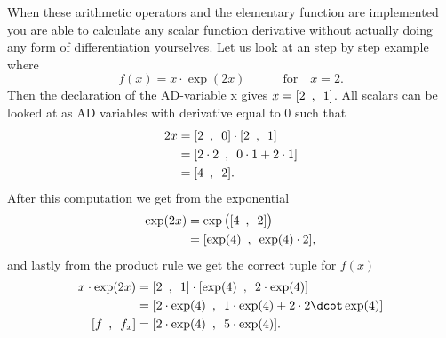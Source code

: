 When these arithmetic operators and the elementary function are implemented you are able to calculate any scalar function derivative without actually doing any form of differentiation yourselves. Let us look at an step by step example where 
\begin{equation}
    \label{eq:forwardADExample}
    f(x) = x\cdot\exp(2x) \hspace{3em} \text{for}\hspace{1em} x = 2.
\end{equation}
Then the declaration of the AD-variable x gives $x = [2 \hspace{0.5em} , \hspace{0.5em}  1]$. All scalars can be looked at as AD variables with derivative equal to 0 such that
\begin{align*}
    2x &= [2 \hspace{0.5em} , \hspace{0.5em}  0]\cdot [2 \hspace{0.5em} , \hspace{0.5em} 1] \\
    &=[2\cdot2 \hspace{0.5em} , \hspace{0.5em}  0\cdot1 + 2\cdot 1]\\
    &=[4 \hspace{0.5em} , \hspace{0.5em} 2].
\end{align*}
After this computation we get from the exponential
\begin{align*}
    \exp(2x) &= \exp\big([4 \hspace{0.5em} , \hspace{0.5em} 2]\big)\\
    &= [\exp(4) \hspace{0.5em} , \hspace{0.5em} \exp(4)\cdot 2],
\end{align*}
and lastly from the product rule we get the correct tuple for $f(x)$
\begin{align*}
    x\cdot \exp(2x) &= [2 \hspace{0.5em} , \hspace{0.5em}  1]\cdot [\exp(4)\hspace{0.5em}, \hspace{0.5em} 2\cdot\exp(4)]\\
    &=[2\cdot\exp(4) \hspace{0.5em} , \hspace{0.5em}  1\cdot \exp(4) + 2\cdot 2\dcot\exp(4)]\\
    [f\hspace{0.5em},\hspace{0.5em} f_x]&=[2\cdot\exp(4) \hspace{0.5em} , \hspace{0.5em} 5\cdot\exp(4)].
\end{align*}
